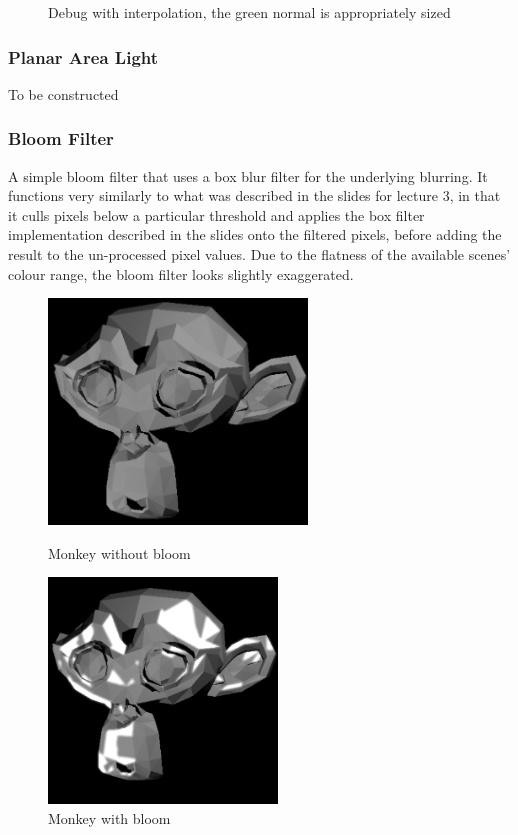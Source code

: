 \documentclass{article}
\begin{document}
\begin{figure}[!htb]
        \caption*{Debug with interpolation, the green normal is appropriately sized}
      \endminipage
    \end{figure}

    \subsubsection{Planar Area Light}
    To be constructed

    \subsubsection{Bloom Filter}
    A simple bloom filter that uses a box blur filter for the underlying blurring. It functions very similarly 
    to what was described in the slides for lecture 3, in that it culls pixels below a particular threshold 
    and applies the box filter implementation described in the slides onto the filtered pixels, before adding 
    the result to the un-processed pixel values. Due to the flatness of the available scenes' colour range,
    the bloom filter looks slightly exaggerated.

    \begin{figure}[!htb]
          \includegraphics[width=\linewidth, height=6cm]{images/monkey_no_bloom}
          \caption*{Monkey without bloom}
        \endminipage\hfill
          \includegraphics[width=\linewidth, height=6cm]{images/monkey_bloom}
          \caption*{Monkey with bloom}
        \endminipage
    \end{figure}
    
\end{document}

